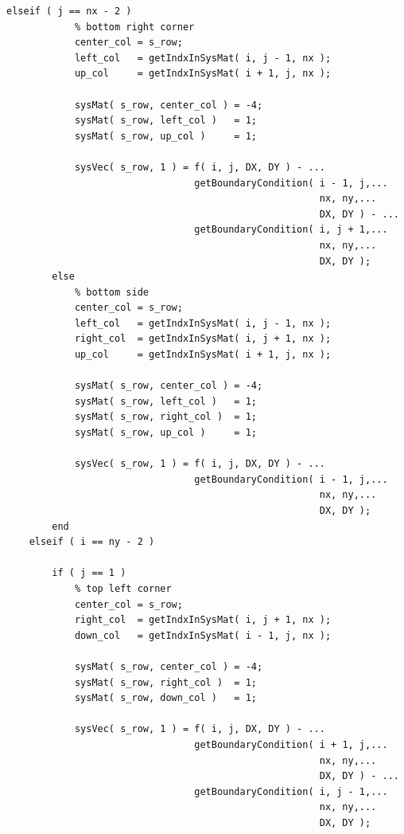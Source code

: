 \begin{itemize}
\begin{lstlisting}[frame=single]
        elseif ( j == nx - 2 )
            % bottom right corner
            center_col = s_row;
            left_col   = getIndxInSysMat( i, j - 1, nx );
            up_col     = getIndxInSysMat( i + 1, j, nx );

            sysMat( s_row, center_col ) = -4;
            sysMat( s_row, left_col )   = 1;
            sysMat( s_row, up_col )     = 1;

            sysVec( s_row, 1 ) = f( i, j, DX, DY ) - ...
                                 getBoundaryCondition( i - 1, j,...
                                                       nx, ny,...
                                                       DX, DY ) - ...
                                 getBoundaryCondition( i, j + 1,...
                                                       nx, ny,...
                                                       DX, DY );
        else
            % bottom side
            center_col = s_row;
            left_col   = getIndxInSysMat( i, j - 1, nx );
            right_col  = getIndxInSysMat( i, j + 1, nx );
            up_col     = getIndxInSysMat( i + 1, j, nx );

            sysMat( s_row, center_col ) = -4;
            sysMat( s_row, left_col )   = 1;
            sysMat( s_row, right_col )  = 1;
            sysMat( s_row, up_col )     = 1;

            sysVec( s_row, 1 ) = f( i, j, DX, DY ) - ...
                                 getBoundaryCondition( i - 1, j,...
                                                       nx, ny,...
                                                       DX, DY );
        end
    elseif ( i == ny - 2 )
        
        if ( j == 1 )
            % top left corner
            center_col = s_row;
            right_col  = getIndxInSysMat( i, j + 1, nx );
            down_col   = getIndxInSysMat( i - 1, j, nx );

            sysMat( s_row, center_col ) = -4;
            sysMat( s_row, right_col )  = 1;
            sysMat( s_row, down_col )   = 1;

            sysVec( s_row, 1 ) = f( i, j, DX, DY ) - ...
                                 getBoundaryCondition( i + 1, j,...
                                                       nx, ny,...
                                                       DX, DY ) - ...
                                 getBoundaryCondition( i, j - 1,...
                                                       nx, ny,...
                                                       DX, DY );


\end{lstlisting}
\end{itemize}
